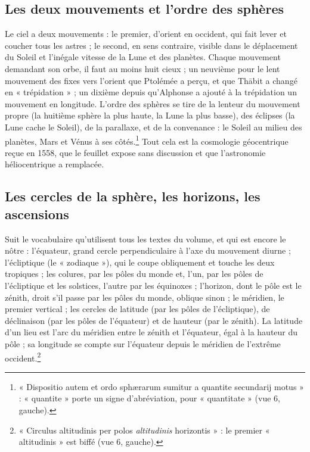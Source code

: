 \documentclass[11pt,a4paper]{article}
\begin{document}
\subsection*{Les deux mouvements et l'ordre des sphères}

Le ciel a deux mouvements : le premier, d'orient en occident, qui fait lever et
coucher tous les astres ; le second, en sens contraire, visible dans le
déplacement du Soleil et l'inégale vitesse de la Lune et des planètes. Chaque
mouvement demandant son orbe, il faut au moins huit cieux ; un neuvième pour le
lent mouvement des fixes vers l'orient que Ptolémée a perçu, et que Thābit a
changé en « trépidation » ; un dixième depuis qu'Alphonse a ajouté à la
trépidation un mouvement en longitude. L'ordre des sphères se tire de la lenteur
du mouvement propre (la huitième sphère la plus haute, la Lune la plus basse),
des éclipses (la Lune cache le Soleil), de la parallaxe, et de la convenance :
le Soleil au milieu des planètes, Mars et Vénus à ses côtés.\footnote{« Dispositio
autem et ordo sphærarum sumitur a quantite secundarij motus » : « quantite »
porte un signe d'abréviation, pour « quantitate » (vue 6, gauche).} Tout cela
est la cosmologie géocentrique reçue en 1558, que le feuillet expose sans
discussion et que l'astronomie héliocentrique a remplacée.

\subsection*{Les cercles de la sphère, les horizons, les ascensions}

Suit le vocabulaire qu'utilisent tous les textes du volume, et qui est encore
le nôtre : l'équateur, grand cercle perpendiculaire à l'axe du mouvement diurne ;
l'écliptique (le « zodiaque »), qui le coupe obliquement et touche les deux
tropiques ; les colures, par les pôles du monde et, l'un, par les pôles de
l'écliptique et les solstices, l'autre par les équinoxes ; l'horizon, dont le
pôle est le zénith, droit s'il passe par les pôles du monde, oblique sinon ; le
méridien, le premier vertical ; les cercles de latitude (par les pôles de
l'écliptique), de déclinaison (par les pôles de l'équateur) et de hauteur (par
le zénith). La latitude d'un lieu est l'arc du méridien entre le zénith et
l'équateur, égal à la hauteur du pôle ; sa longitude se compte sur l'équateur
depuis le méridien de l'extrême occident.\footnote{« Circulus altitudinis per
polos \emph{altitudinis} horizontis » : le premier « altitudinis » est biffé
(vue 6, gauche).}
\end{document}
